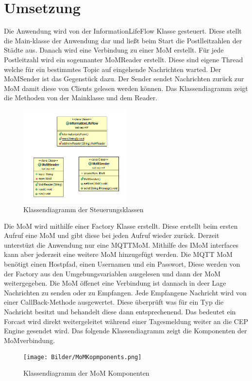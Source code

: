 \section{Umsetzung}
Die Anwendung wird von der InformationLifeFlow Klasse gesteuert. Diese stellt die Main-klasse der Anwendung dar und ließt beim Start die Postlleitzahlen der Städte aus. Danach wird eine Verbindung zu einer MoM erstellt. Für jede Postleitzahl wird ein sogennanter MoMReader erstellt. Diese sind eigene Thread welche für ein bestimmtes Topic auf eingehende Nachrichten warted. Der MoMSender ist das Gegenstück dazu. Der Sender sendet Nachrichten zurück zur MoM damit diese von Clients gelesen werden können. Das Klassendiagramm zeigt die Methoden von der Mainklasse und dem Reader.
\begin{figure}[htbp]
	\centering
	\includegraphics[width=0.5\textwidth]{Bilder/FlowAndReader.png}
	\caption{Klassendiagramm der Steuerungsklassen}
	\label{img:flowDiagramm}
\end{figure} 
Die MoM wird mithilfe einer Factory Klasse erstellt. Diese erstellt beim ersten Aufruf eine MoM und gibt diese bei jeden Aufruf wieder zurück. Derzeit unterstüzt die Anwendung nur eine MQTTMoM. Mithilfe des IMoM interfaces kann aber jederzeit eine weitere MoM hinzugefügt werden. Die MQTT MoM benötigt einen Hostpfad, einen Usernamen und ein Passwort, Diese werden von der Factory aus den Umgebungsvariablen ausgelesen und dann der MoM weitergegeben. Die MoM öffenet eine Verbindung ist dannach in deer Lage Nachrichten zu senden oder zu Empfangen. Jede Empfangene Nachricht wird von einer CallBack-Methode ausgewertet. Diese überprüft was für ein Typ die Nachricht besitzt und behandelt diese dann entsprechenend. Das bedeutet ein Forcast wird direkt weitergeleitet während einer Tagesmeldung weiter an die CEP Engine gesendet wird. Das folgende Klassendiagramm zeigt die Komponenten der MoMverbindung.
\begin{figure}[htbp]
	\centering
	\texttt{[image: Bilder/MoMKopmponents.png]}
	\caption{Klassendiagramm der MoM Komponenten}
	\label{img:MoMDiagramm}
\end{figure} 
